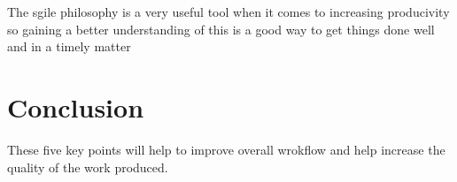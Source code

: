 \documentclass{scrartcl}
\begin{document}
The sgile philosophy is a very useful tool when it comes to increasing producivity so gaining a better understanding of this is a good way to get things done well and in a timely matter

\section{Conclusion}

These five key points will help to improve overall wrokflow and help increase the quality of the work produced.



\end{document}
